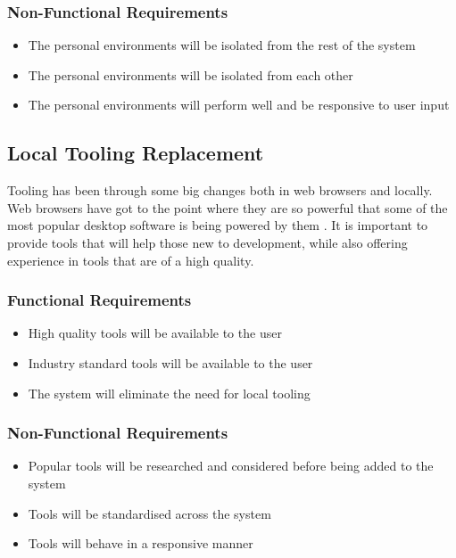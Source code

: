 \subsubsection{Non-Functional Requirements}
\begin{itemize}
    \setlength{\itemsep}{0em}
    \item The personal environments will be isolated from the rest of the system
    \item The personal environments will be isolated from each other
    \item The personal environments will perform well and be responsive to user input
\end{itemize}

\subsection{Local Tooling Replacement}
Tooling has been through some big changes both in web browsers and locally. Web browsers have got to the point where they are so powerful that some of the most popular desktop software is being powered by them \cite{carlo}. It is important to provide tools that will help those new to development, while also offering experience in tools that are of a high quality.

\subsubsection{Functional Requirements}
\begin{itemize}
    \setlength{\itemsep}{0em}
    \item High quality tools will be available to the user
    \item Industry standard tools will be available to the user
    \item The system will eliminate the need for local tooling
\end{itemize}
\subsubsection{Non-Functional Requirements}
\begin{itemize}
    \setlength{\itemsep}{0em}
    \item Popular tools will be researched and considered before being added to the system
    \item Tools will be standardised across the system
    \item Tools will behave in a responsive manner
\end{itemize}

